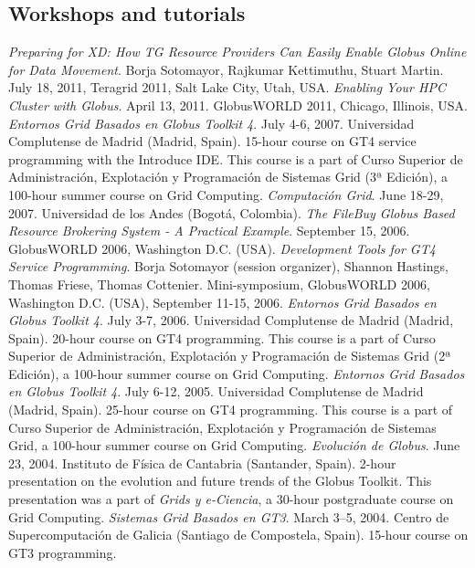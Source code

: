 \documentclass{resume}
\begin{document}
\subsection*{Workshops and tutorials}
\begin{category}{}
\citembullet \emph{Preparing for XD: How TG Resource Providers Can Easily Enable Globus Online for Data Movement}. Borja Sotomayor, Rajkumar Kettimuthu, Stuart Martin. July 18, 2011, Teragrid 2011, Salt Lake City, Utah, USA.
\citembullet \emph{Enabling Your HPC Cluster with Globus}. April 13, 2011. GlobusWORLD 2011, Chicago, Illinois, USA.
\citembullet \emph{Entornos Grid Basados en Globus Toolkit 4}. July 4-6, 2007. Universidad Complutense de Madrid (Madrid, Spain). 15-hour course on GT4 service programming with the Introduce IDE. This course is a part of Curso Superior de Administración, Explotación y Programación de Sistemas Grid (3ª Edición), a 100-hour summer course on Grid Computing.
\citembullet \emph{Computación Grid}. June 18-29, 2007. Universidad de los Andes (Bogotá, Colombia). 
\citembullet \emph{The FileBuy Globus Based Resource Brokering System - A Practical Example}. September 15, 2006. GlobusWORLD 2006, Washington D.C. (USA).
\citembullet \emph{Development Tools for GT4 Service Programming}. Borja Sotomayor (session organizer), Shannon Hastings, Thomas Friese, Thomas Cottenier. Mini-symposium, GlobusWORLD 2006, Washington D.C. (USA), September 11-15, 2006.
\citembullet \emph{Entornos Grid Basados en Globus Toolkit 4}. July 3-7, 2006. Universidad Complutense de Madrid (Madrid, Spain). 20-hour course on GT4 programming. This course is a part of Curso Superior de Administración, Explotación y Programación de Sistemas Grid (2ª Edición), a 100-hour summer course on Grid Computing.
\citembullet \emph{Entornos Grid Basados en Globus Toolkit 4}. July 6-12, 2005. Universidad Complutense de Madrid (Madrid, Spain). 25-hour course on GT4 programming. This course is a part of Curso Superior de Administración, Explotación y Programación de Sistemas Grid, a 100-hour summer course on Grid Computing.
\citembullet \emph{Evolución de Globus}. June 23, 2004. Instituto de Física de Cantabria (Santander, Spain). 2-hour presentation on the evolution and future trends of the Globus Toolkit. This presentation was a part of \emph{Grids y e-Ciencia}, a 30-hour postgraduate course on Grid Computing.
\citembullet \emph{Sistemas Grid Basados en GT3}. March 3--5, 2004. Centro de Supercomputación de Galicia (Santiago de Compostela, Spain). 15-hour course on GT3 programming.
\end{category}
\end{document}
